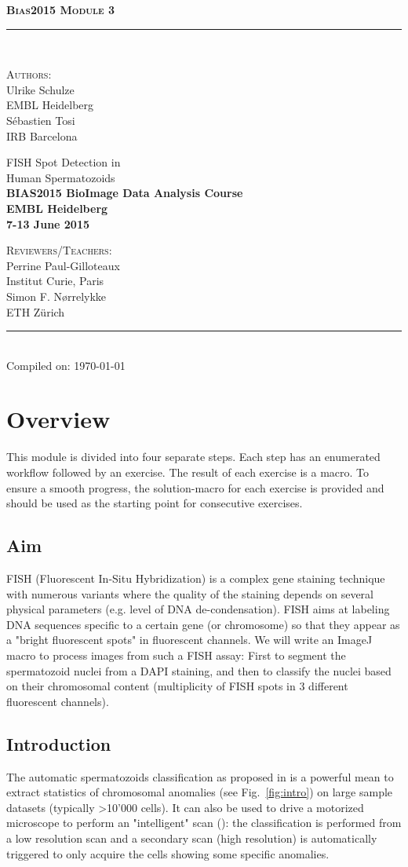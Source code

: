 \documentclass[11pt,a4paper,oneside]{report}
\newcommand{\HRule}{\rule{\linewidth}{0.5mm}}
\newcommand*{\titleTH}{\begingroup
\raggedleft

\textsc{\textbf{\Large{Bias2015 \hfill Module 3}}} 
\HRule\\
\vspace*{\baselineskip}


\hfill \textsc{{\large Authors:}}\\
[0.3\baselineskip]
\hfill {\Large Ulrike Schulze}\\
{\small EMBL Heidelberg}\\
[0.3\baselineskip]
\hfill {\Large S\'{e}bastien Tosi}\\
{\small IRB Barcelona}\\
\vfill


{\textcolor{Medium}{\Huge FISH Spot Detection  in \\ Human Spermatozoids }}\\
[2\baselineskip]

{\bfseries BIAS2015 BioImage Data Analysis Course}\\
\textbf{EMBL Heidelberg}\\
\textbf{7-13 June 2015}

\vfill

\hfill\textsc{Reviewers/Teachers:}\\
[0.3\baselineskip]
{\large Perrine Paul-Gilloteaux}\\
{\small \hfill Institut Curie, Paris}\\
[0.3\baselineskip]
{\large \hfill Simon F. N\o rrelykke}\\
{\small \hfill ETH Z\"urich}\\
\HRule\\

{\small \hfill\textcolor{Medium}{ Compiled on: \today }}
\endgroup}
\begin{document}
\date{\today}
\pagestyle{empty}
\titleTH
\clearpage
\pagestyle{fancyplain}

\begingroup
\hypersetup{linkcolor=black}
\tableofcontents
\endgroup

\clearpage

\setcounter{chapter}{3}

\clearpage{}\setcounter{section}{-1} 
\setcounter{exerciseCounter}{1}

\section{Overview}

This module is divided into four separate steps. Each step has an enumerated workflow followed by an exercise. The result of each exercise is a macro. To ensure a smooth progress, the solution-macro for each exercise is provided and should be used as the starting point for consecutive exercises.

\subsection{Aim}

FISH (Fluorescent In-Situ Hybridization) is a complex gene staining technique with numerous variants \cite{volpi2008fish} where the quality of the staining depends on several physical parameters (e.g. level of DNA de-condensation). FISH aims at labeling DNA sequences specific to a certain gene (or chromosome) so that they appear as a "bright fluorescent spots" in fluorescent channels. We will write an ImageJ macro to process images from such a FISH assay: First to segment the spermatozoid nuclei from a DAPI staining, and then to classify the nuclei based on their chromosomal content (multiplicity of FISH spots in 3 different fluorescent channels).

\subsection{Introduction}

The automatic spermatozoids classification as proposed in \cite{molina2009fish} is a powerful mean to extract statistics of chromosomal anomalies (see Fig.~\ref{fig:intro}) on large sample datasets (typically >10'000 cells). It can also be used to drive a motorized microscope to perform an "intelligent" scan (\cite{tosi2012}): the classification is performed from a low resolution scan and a secondary scan (high resolution) is automatically triggered to only acquire the cells showing some specific anomalies.
\end{document}
